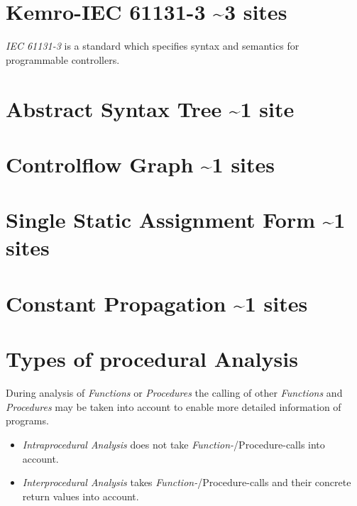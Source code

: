 \section{Kemro-IEC 61131-3 \textasciitilde 3 sites}
\emph{IEC 61131-3} is a standard which specifies syntax and semantics for programmable controllers. 
% 
 
\section{Abstract Syntax Tree \textasciitilde 1 site}
\section{Controlflow Graph \textasciitilde 1 sites}
\section{Single Static Assignment Form \textasciitilde 1 sites}
\section{Constant Propagation \textasciitilde 1 sites}
\section{Types of procedural Analysis}

During analysis of \emph{Functions} or \emph{Procedures} the calling of other \emph{Functions} and \emph{Procedures} may be taken into account to enable more detailed information of programs.


\begin{itemize}
	\item \emph{Intraprocedural Analysis} does not take \emph{Function-}/Procedure-calls into account. 
	\item \emph{Interprocedural Analysis} takes \emph{Function-}/Procedure-calls and their concrete return values into account.
\end{itemize}


